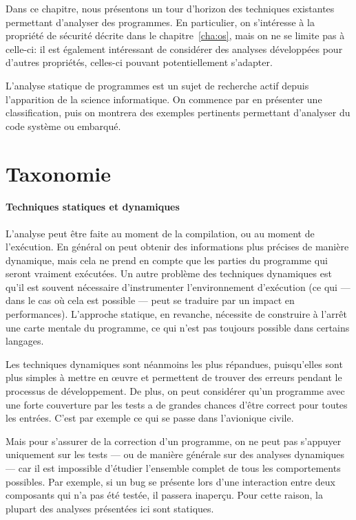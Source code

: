 Dans ce chapitre, nous présentons un tour d'horizon des techniques existantes
permettant d'analyser des programmes. En particulier, on s'intéresse à la
propriété de sécurité décrite dans le chapitre~\ref{cha:os}, mais on ne se
limite pas à celle-ci: il est également intéressant de considérer des analyses
développées pour d'autres propriétés, celles-ci pouvant potentiellement
s'adapter.

L'analyse statique de programmes est un sujet de recherche actif depuis
l'apparition de la science informatique. On commence par en présenter une
classification, puis on montrera des exemples pertinents permettant d'analyser
du code système ou embarqué.

\section{Taxonomie}

\paragraph{Techniques statiques et dynamiques}

L'analyse peut être faite au moment de la compilation, ou au moment de
l'exécution. En général on peut obtenir des informations plus précises de
manière dynamique, mais cela ne prend en compte que les parties du programme qui
seront vraiment exécutées. Un autre problème des techniques dynamiques est qu'il
est souvent nécessaire d'instrumenter l'environnement d'exécution (ce qui ---
dans le cas où cela est possible --- peut se traduire par un impact en
performances). L'approche statique, en revanche, nécessite de construire à
l'arrêt une carte mentale du programme, ce qui n'est pas toujours possible dans
certains langages.

Les techniques dynamiques sont néanmoins les plus répandues, puisqu'elles sont
plus simples à mettre en œuvre et permettent de trouver des erreurs pendant le
processus de développement. De plus, on peut considérer qu'un programme avec une
forte couverture par les tests a de grandes chances d'être correct pour toutes
les entrées. C'est par exemple ce qui se passe dans l'avionique civile.

Mais pour s'assurer de la correction d'un programme, on ne peut pas s'appuyer
uniquement sur les tests --- ou de manière générale sur des analyses dynamiques
--- car il est impossible d'étudier l'ensemble complet de tous les comportements
possibles. Par exemple, si un bug se présente lors d'une interaction entre deux
composants qui n'a pas été testée, il passera inaperçu. Pour cette raison, la
plupart des analyses présentées ici sont statiques.

